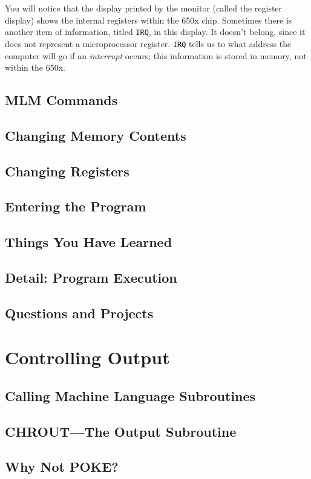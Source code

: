 \documentclass[11pt,a4paper,titlepage]{memoir}
\begin{document}
You will notice that the display printed by the monitor (called the register
display) shows the internal registers within the 650x chip. Sometimes there
is another item of information, titled \texttt{IRQ}, in this display. It doesn't belong,
since it does not represent a microprocessor register. \texttt{IRQ} tells us to what
address the computer will go if an \emph{interrupt} occurs; this information is
stored in memory, not within the 650x.
\section{MLM Commands}
\blindtext
\section{Changing Memory Contents}
\blindtext
\section{Changing Registers}
\blindtext
\section{Entering the Program}
\blindtext
\section{Things You Have Learned}
\blindtext
\section{Detail: Program Execution}
\blindtext
\section{Questions and Projects}
\blindtext
\chapter{Controlling Output}
\blindtext
\newpage
\section{Calling Machine Language Subroutines}
\blindtext
\section{CHROUT—The Output Subroutine}
\blindtext
\section{Why Not POKE?}
\blindtext
\end{document}
